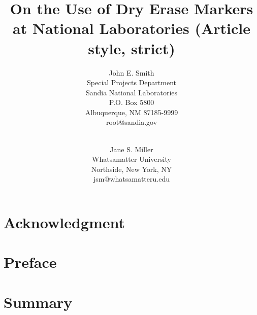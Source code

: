 \documentclass[pdf,ps2pdf,12pt,strict,blank,OUO]{SANDreport}
\title{On the Use of Dry Erase Markers at National Laboratories (Article style, strict)}
\author{John E. Smith \\
	  Special Projects Department \\
	  Sandia National Laboratories\\
	  P.O. Box 5800\\
	  Albuquerque, NM 87185-9999 \\
	  root@sandia.gov \\
	  \\
	  \and
	  Jane S. Miller \\
	  Whatsamatter University \\
	  Northside, New York, NY\\
	  jsm@whatsamatteru.edu
	 }
\date{}
\begin{document}
    \maketitle

    \begin{abstract}
	
    \end{abstract}


    \clearpage
    \section*{Acknowledgment}
	



    \cleardoublepage		%
    \tableofcontents
    \listoffigures
    \listoftables


    \clearpage
    \section*{Preface}
	


    \clearpage
    \section*{Summary}
	


    \clearpage
\end{document}
